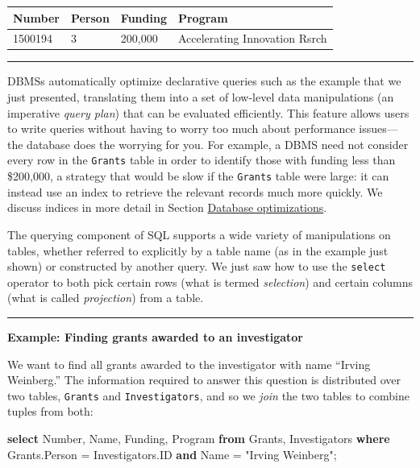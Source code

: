 \documentclass[]{krantz}
\newenvironment{Shaded}{\begin{snugshade}}{\end{snugshade}}
\newcommand{\KeywordTok}[1]{\textcolor[rgb]{0.13,0.29,0.53}{\textbf{#1}}}
\newcommand{\DataTypeTok}[1]{\textcolor[rgb]{0.13,0.29,0.53}{#1}}
\newcommand{\OtherTok}[1]{\textcolor[rgb]{0.56,0.35,0.01}{#1}}
\newcommand{\NormalTok}[1]{#1}
\begin{document}
\begin{longtable}[]{@{}llll@{}}
\toprule
\textbf{Number} & \textbf{Person} & \textbf{Funding} &
\textbf{Program}\tabularnewline
\midrule
\endhead
1500194 & 3 & 200,000 & Accelerating Innovation Rsrch\tabularnewline
\bottomrule
\end{longtable}

\begin{center}\rule{0.5\linewidth}{\linethickness}\end{center}

DBMSs automatically optimize declarative queries such as the example
that we just presented, translating them into a set of low-level data
manipulations (an imperative \emph{query plan}) that can be evaluated
efficiently. This feature allows users to write queries without having
to worry too much about performance issues---the database does the
worrying for you. For example, a DBMS need not consider every row in the
\texttt{Grants} table in order to identify those with funding less than
\$200,000, a strategy that would be slow if the \texttt{Grants} table
were large: it can instead use an index to retrieve the relevant records
much more quickly. We discuss indices in more detail in Section
\protect\hyperlink{sec:db:index}{Database optimizations}.

The querying component of SQL supports a wide variety of manipulations
on tables, whether referred to explicitly by a table name (as in the
example just shown) or constructed by another query. We just saw how to
use the \texttt{select} operator to both pick certain rows (what is
termed \emph{selection}) and certain columns (what is called
\emph{projection}) from a table.

\begin{center}\rule{0.5\linewidth}{\linethickness}\end{center}

\textbf{Example: Finding grants awarded to an investigator}

We want to find all grants awarded to the investigator with name
``Irving Weinberg.'' The information required to answer this question is
distributed over two tables, \texttt{Grants} and \texttt{Investigators},
and so we \emph{join} the two tables to combine tuples from both:

\begin{Shaded}
\begin{Highlighting}[]
\KeywordTok{select} \DataTypeTok{Number}\NormalTok{, Name, Funding, Program}
\KeywordTok{from}\NormalTok{ Grants, Investigators}
\KeywordTok{where}\NormalTok{ Grants.Person = Investigators.ID}
\KeywordTok{and}\NormalTok{ Name = }\OtherTok{"Irving Weinberg"}\NormalTok{;}
\end{Highlighting}
\end{Shaded}
\end{document}
